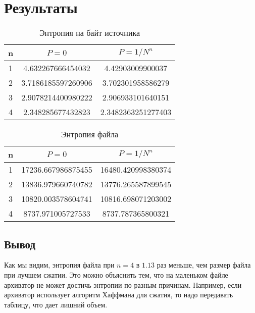 \documentclass{article}
\begin{document}
\section{Результаты}
\begin{table}[H]
\begin{tabular}{|c|c|c|}
\hline
n & $P = 0$ & $P = 1 / N^n$\\
\hline
1 & 4.632267666454032 & 4.42903009900037\\
2 & 3.7186185597260906 & 3.702301958586279\\
3 & 2.9078214400980222 & 2.906933101640151\\
4 & 2.348285677432823 & 2.3482363251277403\\
\hline
\end{tabular}
\captionsetup{singlelinecheck=off,justification=raggedright}
\caption{\label{tab:widgets}Энтропия на байт источника}
\end{table}
\begin{table}[H]
\begin{tabular}{|c|c|c|}
\hline
n & $P = 0$ & $P = 1 / N^n$\\
\hline
1 & 17236.667986875455 & 16480.420998380374\\
2 & 13836.979660740782 & 13776.265587899545\\
3 & 10820.003578604741 & 10816.698071203002\\
4 & 8737.971005727533  & 8737.787365800321 \\
\hline
\end{tabular}
\captionsetup{singlelinecheck=off,justification=raggedright}
\caption{\label{tab:widgets}Энтропия файла}
\end{table}
\subsection{Вывод}
Как мы видим, энтропия файла при $n = 4$ в $1.13$ раз меньше, чем размер файла при лучшем сжатии. Это можно объяснить тем, что на маленьком файле архиватор не может достичь энтропии по разным причинам. Например, если архиватор использует алгоритм Хаффмана для сжатия, то надо передавать таблицу, что дает лишний объем.
\end{document}
